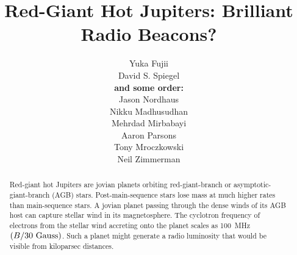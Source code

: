 \documentclass{emulateapj}
\begin{document}

\title{Red-Giant Hot Jupiters: Brilliant Radio Beacons?}

\author{
%
Yuka Fujii \\
%
David S. Spiegel \\
%
{\bf and some order:} \\
%
Jason Nordhaus \\
%
Nikku Madhusudhan \\
%
Mehrdad Mirbabayi \\
%
Aaron Parsons \\
%
Tony Mroczkowski \\
%
Neil Zimmerman
}

  








\vspace{0.5\baselineskip}



\begin{abstract}
  Red-giant hot Jupiters are jovian planets orbiting red-giant-branch
  or asymptotic-giant-branch (AGB) stars.  Post-main-sequence stars
  lose mass at much higher rates than main-sequence stars.  A jovian
  planet passing through the dense winds of its AGB host can capture
  stellar wind in its magnetosphere.  The cyclotron frequency of
  electrons from the stellar wind accreting onto the planet scales as
  100~MHz~$(B/30 {\rm~Gauss})$.  Such a planet might generate a radio
  luminosity that would be visible from kiloparsec distances.
\end{abstract}
\end{document}
